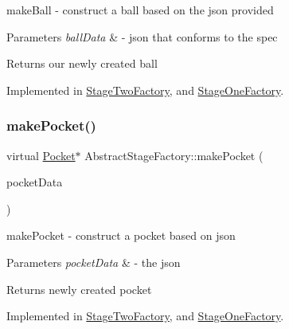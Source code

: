 make\+Ball -\/ construct a ball based on the json provided 


\begin{DoxyParams}{Parameters}
{\em ball\+Data} & -\/ json that conforms to the spec \\
\hline
\end{DoxyParams}
\begin{DoxyReturn}{Returns}
our newly created ball 
\end{DoxyReturn}


Implemented in \mbox{\hyperlink{class_stage_two_factory_aa12e02122eea28b08b3e148521bc2055}{Stage\+Two\+Factory}}, and \mbox{\hyperlink{class_stage_one_factory_a8a89031bc805b70d93e942275777394d}{Stage\+One\+Factory}}.

\mbox{\label{class_abstract_stage_factory_a6ce57859e00b135049e3b995b7dfc94d}} 
\subsubsection{\texorpdfstring{make\+Pocket()}{makePocket()}}
{\footnotesize\ttfamily virtual \mbox{\hyperlink{class_pocket}{Pocket}}$\ast$ Abstract\+Stage\+Factory\+::make\+Pocket (\begin{DoxyParamCaption}\item[{const Q\+Json\+Object \&}]{pocket\+Data }\end{DoxyParamCaption})\hspace{0.3cm}{\ttfamily [pure virtual]}}



make\+Pocket -\/ construct a pocket based on json 


\begin{DoxyParams}{Parameters}
{\em pocket\+Data} & -\/ the json \\
\hline
\end{DoxyParams}
\begin{DoxyReturn}{Returns}
newly created pocket 
\end{DoxyReturn}


Implemented in \mbox{\hyperlink{class_stage_two_factory_a6b66c413691103cf5df2840bcdb683ef}{Stage\+Two\+Factory}}, and \mbox{\hyperlink{class_stage_one_factory_ab9d7b7d74b61a2fd6c96562a67dc2fe8}{Stage\+One\+Factory}}.

\mbox{\label{class_abstract_stage_factory_a539c855ce9a09e08b7fcb3ffa7f0d3fd}} 
